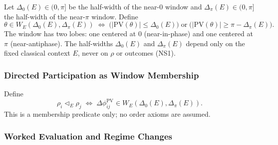 \documentclass[aps,prx,onecolumn,11pt]{revtex4-2}
\theoremstyle{plain}
\theoremstyle{definition}
\theoremstyle{remark}
\begin{document}
Let $\Delta_0(E) \in (0,\pi]$ be the half-width of the near-$0$
window and $\Delta_\pi(E) \in (0,\pi]$ the half-width of the
near-$\pi$ window. Define
\begin{equation}
\theta \in W_E(\Delta_0(E), \Delta_\pi(E))
\;\Longleftrightarrow\;
\bigl(|\mathrm{PV}(\theta)| \le \Delta_0(E)\bigr)
\;\text{or}\;
\bigl(|\mathrm{PV}(\theta)| \ge \pi - \Delta_\pi(E)\bigr).
\label{eq:toy_phasecircle_window_def}
\end{equation}
The window has two lobes: one centered at $0$ (near-in-phase) and one
centered at $\pi$ (near-antiphase). The half-widths $\Delta_0(E)$ and
$\Delta_\pi(E)$ depend only on the fixed classical context $E$, never
on $\rho$ or outcomes (NS1).

\subsubsection{Directed Participation as Window Membership}
\label{subsubsec:toy_phasecircle_ordering_predicate}

Define
\begin{equation}
\rho_i \triangleleft_E \rho_j
\;\Longleftrightarrow\;
\Delta\phi_{ij}^{\mathrm{PV}} \in
W_E(\Delta_0(E), \Delta_\pi(E)).
\label{eq:toy_phasecircle_ordering_relation}
\end{equation}
This is a membership predicate only; no order axioms are assumed.

\subsubsection{Worked Evaluation and Regime Changes}
\label{subsubsec:toy_phasecircle_worked_eval}
\end{document}
